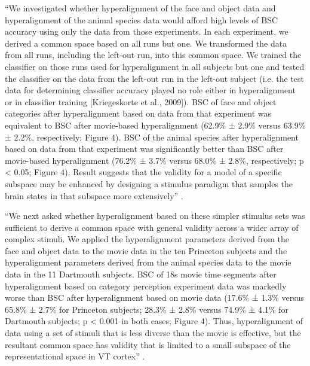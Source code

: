 %
``We investigated whether hyperalignment of the face and object data and
hyperalignment of the animal species data would afford high levels of BSC
accuracy using only the data from those experiments.
%
In each experiment, we derived a common space based on all runs but one. We
transformed the data from all runs, including the left-out run, into this common
space.
%
We trained the classifier on those runs used for hyperalignment in all subjects
but one and tested the classifier on the data from the left-out run in the
left-out subject (i.e. the test data for determining classifier accuracy played
no role either in hyperalignment or in classifier training [Kriegeskorte et al.,
2009]).
%
BSC of face and object categories after hyperalignment based on data from that
experiment was equivalent to BSC after movie-based hyperalignment (62.9\% ±
2.9\% versus 63.9\% ± 2.2\%, respectively; Figure 4).
%
BSC of the animal species after hyperalignment based on data from that
experiment was significantly better than BSC after movie-based hyperalignment
(76.2\% ± 3.7\% versus 68.0\% ± 2.8\%, respectively; p < 0.05; Figure 4).
%
Result suggests that the validity for a model of a specific subspace may be
enhanced by designing a stimulus paradigm that samples the brain states in that
subspace more extensively'' \citep{haxby2011common}.

%
``We next asked whether hyperalignment based on these simpler stimulus sets was
sufficient to derive a common space with general validity across a wider array
of complex stimuli.
%
We applied the hyperalignment parameters derived from the face and object data
to the movie data in the ten Princeton subjects and the hyperalignment
parameters derived from the animal species data to the movie data in the 11
Dartmouth subjects.
%
BSC of 18s movie time segments after hyperalignment based on category perception
experiment data was markedly worse than BSC after hyperalignment based on movie
data (17.6\% ± 1.3\% versus 65.8\% ± 2.7\% for Princeton subjects; 28.3\% ±
2.8\% versus 74.9\% ± 4.1\% for Dartmouth subjects; p < 0.001 in both cases;
Figure 4).
%
Thus, hyperalignment of data using a set of stimuli that is less diverse than
the movie is effective, but the resultant common space has validity that is
limited to a small subspace of the representational space in VT cortex''
\citep{haxby2011common}.

